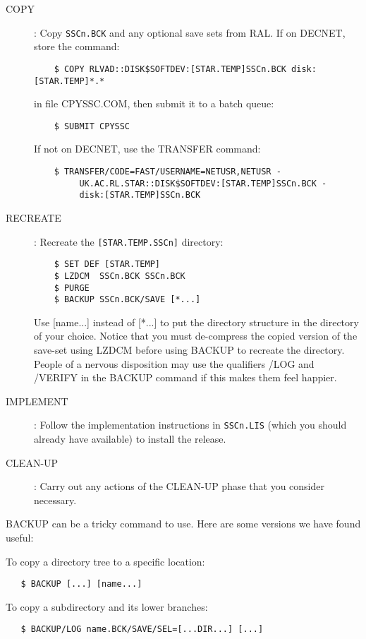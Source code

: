 \begin{description}

\item [COPY]: Copy {\tt SSCn.BCK} and any optional save sets from RAL.
If on DECNET, store the command:
\begin{verbatim}
    $ COPY RLVAD::DISK$SOFTDEV:[STAR.TEMP]SSCn.BCK disk:[STAR.TEMP]*.*
\end{verbatim}
in file CPYSSC.COM, then submit it to a batch queue:
\begin{verbatim}
    $ SUBMIT CPYSSC
\end{verbatim}
If not on DECNET, use the TRANSFER command:
\begin{verbatim}
    $ TRANSFER/CODE=FAST/USERNAME=NETUSR,NETUSR -
         UK.AC.RL.STAR::DISK$SOFTDEV:[STAR.TEMP]SSCn.BCK -
         disk:[STAR.TEMP]SSCn.BCK
\end{verbatim}

\item [RECREATE]: Recreate the {\tt [STAR.TEMP.SSCn]} directory:
\begin{verbatim}
    $ SET DEF [STAR.TEMP]
    $ LZDCM  SSCn.BCK SSCn.BCK
    $ PURGE
    $ BACKUP SSCn.BCK/SAVE [*...]
\end{verbatim}
Use [name...] instead of [*...] to put the directory structure in the directory
of your choice.
Notice that you must de-compress the copied version of the save-set using
LZDCM before using BACKUP to recreate the directory.
People of a nervous disposition may use the qualifiers /LOG and /VERIFY in the
BACKUP command if this makes them feel happier.

\item [IMPLEMENT]: Follow the implementation instructions in {\tt SSCn.LIS}
(which you should already have available) to install the release.

\item [CLEAN-UP]: Carry out any actions of the CLEAN-UP phase that you consider
necessary.
\end{description}

BACKUP can be a tricky command to use.
Here are some versions we have found useful:

To copy a directory tree to a specific location:
\begin{verbatim}
   $ BACKUP [...] [name...]
\end{verbatim}
To copy a subdirectory and its lower branches:
\begin{verbatim}
   $ BACKUP/LOG name.BCK/SAVE/SEL=[...DIR...] [...]
\end{verbatim}

